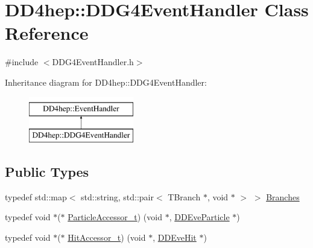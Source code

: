 \hypertarget{class_d_d4hep_1_1_d_d_g4_event_handler}{}\section{D\+D4hep\+:\+:D\+D\+G4\+Event\+Handler Class Reference}
\label{class_d_d4hep_1_1_d_d_g4_event_handler}


{\ttfamily \#include $<$D\+D\+G4\+Event\+Handler.\+h$>$}

Inheritance diagram for D\+D4hep\+:\+:D\+D\+G4\+Event\+Handler\+:\begin{figure}[H]
\begin{center}
\leavevmode
\includegraphics[height=2.000000cm]{class_d_d4hep_1_1_d_d_g4_event_handler}
\end{center}
\end{figure}
\subsection*{Public Types}
\begin{DoxyCompactItemize}
\item 
typedef std\+::map$<$ std\+::string, std\+::pair$<$ T\+Branch $\ast$, void $\ast$ $>$ $>$ \hyperlink{class_d_d4hep_1_1_d_d_g4_event_handler_accd112cdbf8673e3a80d97e2d5c98241}{Branches}
\item 
typedef void $\ast$($\ast$ \hyperlink{class_d_d4hep_1_1_d_d_g4_event_handler_a7087d24560986c2f222cd60bdf177b0a}{Particle\+Accessor\+\_\+t}) (void $\ast$, \hyperlink{class_d_d4hep_1_1_d_d_eve_particle}{D\+D\+Eve\+Particle} $\ast$)
\item 
typedef void $\ast$($\ast$ \hyperlink{class_d_d4hep_1_1_d_d_g4_event_handler_a523becfb4ac453b193adef28b8679d5c}{Hit\+Accessor\+\_\+t}) (void $\ast$, \hyperlink{class_d_d4hep_1_1_d_d_eve_hit}{D\+D\+Eve\+Hit} $\ast$)
\end{DoxyCompactItemize}
